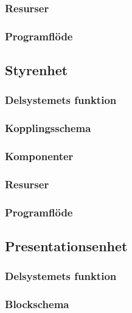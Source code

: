 \documentclass{article}
\begin{document}
\subsubsection{Resurser}

\subsubsection{Programflöde}

\clearpage

\subsection{Styrenhet}

\subsubsection{Delsystemets funktion}

\subsubsection{Kopplingsschema}

\subsubsection{Komponenter}

\subsubsection{Resurser}

\subsubsection{Programflöde}

\clearpage

\subsection{Presentationsenhet}

\subsubsection{Delsystemets funktion}

\subsubsection{Blockschema}
\end{document}
